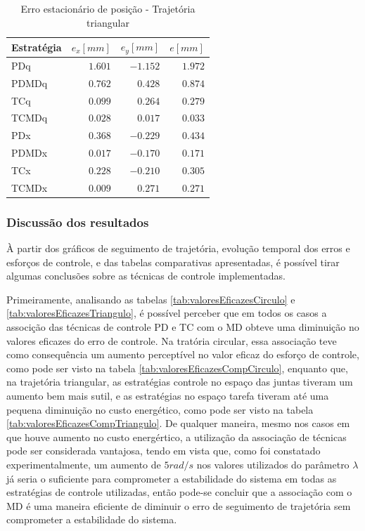\documentclass[]{politex}
\begin{document}
\begin{table}[H] 
\centering
\caption{Erro estacionário de posição - Trajetória triangular}
\label{tab:valorFinalTriangulo}
\begin{tabular}{l|r|r|r}
Estratégia & $e_x [mm]$ & $e_y [mm]$ & $e [mm]$ \\ \hline
PDq        & $ 1.601$   & $-1.152$   & $1.972$  \\
PDMDq      & $ 0.762$   & $ 0.428$   & $0.874$  \\
TCq        & $ 0.099$   & $ 0.264$   & $0.279$  \\
TCMDq      & $ 0.028$   & $ 0.017$   & $0.033$  \\
PDx        & $ 0.368$   & $-0.229$   & $0.434$  \\
PDMDx      & $ 0.017$   & $-0.170$   & $0.171$  \\
TCx        & $ 0.228$   & $-0.210$   & $0.305$  \\
TCMDx      & $ 0.009$   & $ 0.271$   & $0.271$  \\
\end{tabular}
\end{table}

\subsubsection{Discussão dos resultados}

À partir dos gráficos de seguimento de trajetória, evolução temporal dos erros e esforços de controle, e das tabelas comparativas apresentadas, é possível tirar algumas conclusões sobre as técnicas de controle implementadas.

Primeiramente, analisando as tabelas \ref{tab:valoresEficazesCirculo} e \ref{tab:valoresEficazesTriangulo}, é possível perceber que em todos os casos a associção das técnicas de controle PD e TC com o MD obteve uma diminuição no valores eficazes do erro de controle. Na tratória circular, essa associação teve como consequência um aumento perceptível no valor eficaz do esforço de controle, como pode ser visto na tabela \ref{tab:valoresEficazesCompCirculo}, enquanto que, na trajetória triangular, as estratégias controle no espaço das juntas tiveram um aumento bem mais sutil, e as estratégias no espaço tarefa tiveram até uma pequena diminuição no custo energético, como pode ser visto na tabela \ref{tab:valoresEficazesCompTriangulo}. De qualquer maneira, mesmo nos casos em que houve aumento no custo energértico, a utilização da associação de técnicas pode ser considerada vantajosa, tendo em vista que, como foi constatado experimentalmente, um aumento de $5rad/s$ nos valores utilizados do parâmetro $\lambda$  já seria o suficiente para comprometer a estabilidade do sistema em todas as estratégias de controle utilizadas, então pode-se concluir que a associação com o MD é uma maneira eficiente de diminuir o erro de seguimento de trajetória sem comprometer a estabilidade do sistema.  
\end{document}

